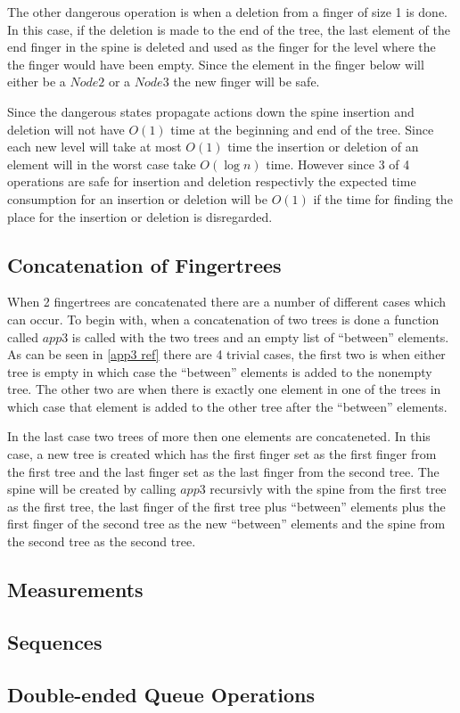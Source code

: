 The other dangerous operation is when a deletion from a finger of size 1 is
done. In this case, if the deletion is made to the end of the tree, the last
element of the end finger in the spine is deleted and used as the finger for the
level where the the finger would have been empty. Since the element in the
finger below will either be a $Node2$ or a $Node3$ the new finger will be safe.

Since the dangerous states propagate actions down the spine insertion and
deletion will not have $O(1)$ time at the beginning and end of the tree. Since
each new level will take at most $O(1)$ time the insertion or deletion of an
element will in the worst case take $O(\log n)$ time. However since 3 of 4
operations are safe for insertion and deletion respectivly the expected time
consumption for an insertion or deletion will be $O(1)$ if the time for finding
the place for the insertion or deletion is disregarded.

\subsection{Concatenation of Fingertrees}
When 2 fingertrees are concatenated there are a number of different cases which
can occur. To begin with, when a concatenation of two trees is done a function
called $app3$ is called with the two trees and an empty list of ``between''
elements. As can be seen in \cref{app3 ref} there are 4 trivial cases, the first
two is when either tree is empty in which case the ``between'' elements is
added to the nonempty tree. The other two are when there is exactly one element
in one of the trees in which case that element is added to the other tree after
the ``between'' elements.

In the last case two trees of more then one elements
are concateneted. In this case, a new tree is created which has the first
finger set as the first finger from the first tree and the last finger set as
the last finger from the second tree. The spine will be created by calling
$app3$ recursivly with the spine from the first tree as the first tree, the last
finger of the first tree plus ``between'' elements plus the first finger of the
second tree as the new ``between'' elements and the spine from the second tree
as the second tree.


\subsection{Measurements}
\subsection{Sequences}
\subsection{Double-ended Queue Operations}
